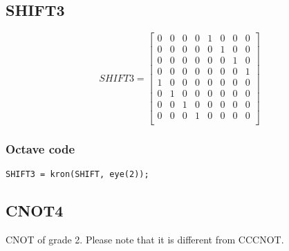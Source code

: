 \subsection{SHIFT3}

\begin{equation*}
SHIFT3 =
\begin{bmatrix}
0 & 0 & 0 & 0 & 1 & 0 & 0 & 0\\
0 & 0 & 0 & 0 & 0 & 1 & 0 & 0\\
0 & 0 & 0 & 0 & 0 & 0 & 1 & 0\\
0 & 0 & 0 & 0 & 0 & 0 & 0 & 1\\
1 & 0 & 0 & 0 & 0 & 0 & 0 & 0\\
0 & 1 & 0 & 0 & 0 & 0 & 0 & 0\\
0 & 0 & 1 & 0 & 0 & 0 & 0 & 0\\
0 & 0 & 0 & 1 & 0 & 0 & 0 & 0\\
\end{bmatrix}
\end{equation*}

\subsubsection{Octave code}
\begin{lstlisting}
SHIFT3 = kron(SHIFT, eye(2));
\end{lstlisting}

\subsection{CNOT4}

CNOT of grade 2. Please note that it is different from CCCNOT.

